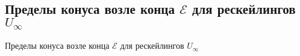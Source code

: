 \subsection{\texorpdfstring{Пределы конуса возле конца $\mathcal{E}$ для рескейлингов $U_{\infty}$}{Пределы конуса возле конца E для рескейлингов U∞}}
Пределы конуса возле конца $\mathcal{E}$ для рескейлингов $U_{\infty}$
